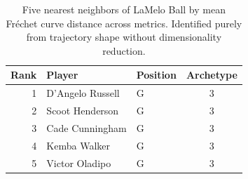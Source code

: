 \begin{table}[htbp]
  \centering\small
  \begin{tabular}{rllc}
    \toprule
    Rank & Player & Position & Archetype \\
    \midrule
    1 & D'Angelo Russell & G & 3 \\
    2 & Scoot Henderson & G & 3 \\
    3 & Cade Cunningham & G & 3 \\
    4 & Kemba Walker & G & 3 \\
    5 & Victor Oladipo & G & 3 \\
    \bottomrule
  \end{tabular}
  \caption{Five nearest neighbors of LaMelo Ball by mean Fr\'{e}chet curve distance across metrics. Identified purely from trajectory shape without dimensionality reduction.}
  \label{tab:LaMelo_Ball_frechet_curve_neighbors}
\end{table}

